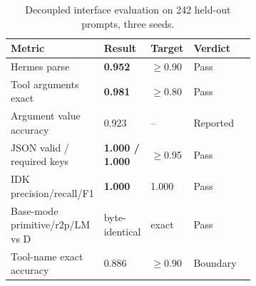 \begin{table}[H]
\caption{Decoupled interface evaluation on 242 held-out prompts, three seeds.\label{tab:interface_eval}}
\footnotesize
\begin{tabularx}{\textwidth}{@{}p{0.34\linewidth}p{0.18\linewidth}p{0.16\linewidth}X@{}}
\toprule
\textbf{Metric} & \textbf{Result} & \textbf{Target} & \textbf{Verdict} \\
\midrule
Hermes parse & \textbf{0.952} & $\ge$0.90 & Pass \\
Tool arguments exact & \textbf{0.981} & $\ge$0.80 & Pass \\
Argument value accuracy & 0.923 & -- & Reported \\
JSON valid / required keys & \textbf{1.000 / 1.000} & $\ge$0.95 & Pass \\
IDK precision/recall/F1 & \textbf{1.000} & 1.000 & Pass \\
Base-mode primitive/r2p/LM vs D & byte-identical & exact & Pass \\
Tool-name exact accuracy & 0.886 & $\ge$0.90 & Boundary \\
\bottomrule
\end{tabularx}
\end{table}

